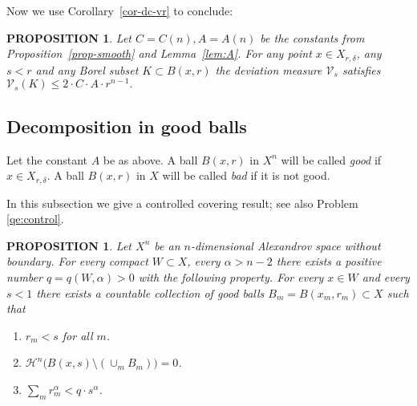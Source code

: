 \documentclass[12pt,leqno,intlimits]{amsart}
\numberwithin{equation}{section}
\newtheorem{prop}[thm]{PROPOSITION}
\theoremstyle{definition}
\theoremstyle{remark}
\newcommand{\cref}[1]{Corollary~\ref{#1}}
\newcommand{\pref}[1]{Proposition~\ref{#1}}
\newcommand{\lref}[1]{Lemma~\ref{#1}}
\def\eps{\varepsilon}
\begin{document}

Now we use \cref{cor-dc-vr} to conclude:

\begin{prop} \label{ballmeasure}
Let $C=C(n),A=A(n)$ be the constants from \pref{prop-smooth} and \lref{lem:A}.
For any point $x\in X_{r,\delta}$, any $s<r$ and any
Borel subset $K\subset B (x,r)$ the deviation measure $\mathcal{V}_s $ satisfies
$\mathcal{V}_s (K) \leq 2\cdot C\cdot A \cdot r^{n-1}.$
\end{prop}

\subsection{Decomposition in good balls}
Let the constant $A$ be as above.
A ball $B(x,r)$ in $X^n$ will be called \emph{good} if $x\in X_{r,\delta}$.
A ball $B(x,r)$ in $X$ will be called \emph{bad} if it is not good.

In this subsection we give a controlled covering result; see also Problem \ref{qe:control}.


\begin{prop}\label{prop:covering}
Let $X^n$ be an $n$-dimensional Alexandrov space without boundary.
For every compact $W\subset X$, every $\alpha >n-2$ there exists
a positive number $ q =q(W,\alpha ) >0$ with the following property. For every $x\in W$ and every $s<1 $
there exists a countable collection of good balls $B_m=B(x_m,{r_m}) \subset X$
such that
\begin{enumerate}
\item $r_m<s$ for all $m$.
\item $ \mathcal H^n \big(B (x,s) \setminus (\cup _m B_m )\big)=0$.
\item $\sum_m r_m^{\alpha}< q \cdot s^{\alpha}$.
\end{enumerate}
\end{prop}
\end{document}
